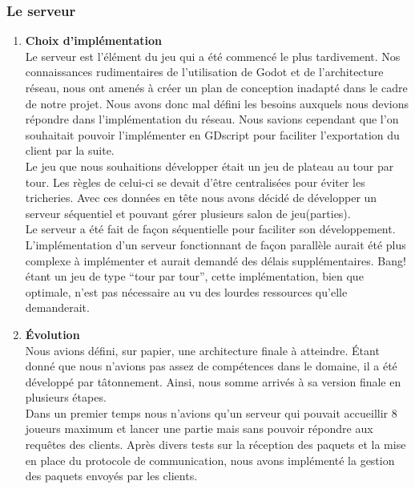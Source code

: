 \documentclass[a4paper,11pt]{article}
\begin{document}
\subsubsection{Le serveur}

\begin{enumerate}
	\item \textbf{Choix d'implémentation} \\
	
	Le serveur est l’élément du jeu qui a été commencé le plus tardivement. Nos connaissances rudimentaires de l’utilisation de Godot et de l’architecture réseau, nous ont amenés à créer un plan de conception inadapté dans le cadre de notre projet. Nous avons donc mal défini les besoins auxquels nous devions répondre dans l’implémentation du réseau. Nous savions cependant que l’on souhaitait pouvoir l'implémenter en GDscript pour faciliter l’exportation du client par la suite. \\
	
Le jeu que nous souhaitions développer était un jeu de plateau au tour par tour. Les règles de celui-ci se devait d'être centralisées pour éviter les tricheries. Avec ces données en tête nous avons décidé de développer un serveur séquentiel et pouvant gérer plusieurs salon de jeu(parties).  \\

Le serveur a été fait de façon séquentielle pour faciliter son développement. L’implémentation d’un serveur fonctionnant de façon parallèle aurait été plus complexe à implémenter et aurait demandé des délais supplémentaires. Bang! étant un jeu de type “tour par tour”, cette implémentation, bien que optimale, n’est pas nécessaire au vu des  lourdes ressources qu’elle demanderait. \\

	
	\item \textbf{Évolution} \\
	
	Nous avions défini, sur papier, une architecture finale à atteindre. Étant donné que nous n’avions pas assez de compétences dans le domaine, il a été développé par tâtonnement.  Ainsi, nous somme arrivés à sa version finale en plusieurs étapes. \\
	
Dans un premier temps nous n’avions qu’un serveur qui pouvait accueillir 8 joueurs maximum et lancer une partie mais sans pouvoir répondre aux requêtes des clients. Après divers tests sur la réception des paquets et la mise en place du protocole de communication, nous avons implémenté la gestion des paquets envoyés par les clients. \\


\end{enumerate}
\end{document}
